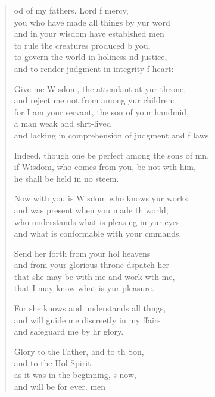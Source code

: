 \begin{verse}
  \begin{patverse}
od of my fathers, Lord f mercy,\Med\\
you who have made all things by yur word\\
and in your wisdom have establ\pointup{\i}shed men\Med\\
to rule the creatures produced b you,\\
to govern the world in holiness nd justice,\Med\\
and to render judgment in integrity f heart:

Give me Wisdom, the attendant at yur throne,\Med\\
and reject me not from among yur children:\\
for I am your servant, the son of your handmid,\Flex\\
a man weak and shrt-lived\Med\\
and lacking in comprehension of judgment and f laws.

Indeed, though one be perfect among the sons of mn,\Flex\\
if Wisdom, who comes from you, be not w\pointup{\i}th him,\Med\\
he shall be held in no steem.

Now with you is Wisdom who knows yur works\Med\\
and was present when you made th world;\\
who understands what is pleasing in yur eyes\Med\\
and what is conformable with your cmmands.

Send her forth from your hol heavens\Med\\
and from your glorious throne d\pointup{\i}spatch her\\
that she may be with me and work w\pointup{\i}th me,\Med\\
that I may know what is yur pleasure.

For she knows and understands all th\pointup{\i}ngs,\Flex\\
and will guide me discreetly in my ffairs\Med\\
and safeguard me by hr glory.

Glory to the Father, and to th Son,\Med\\
and to the Hol Spirit:\\
as it was in the beginning, \pointup{\i}s now,\Med\\
and will be for ever. men
  \end{patverse}
\end{verse}
